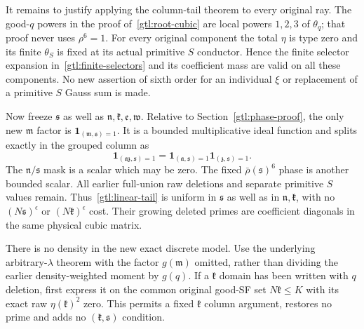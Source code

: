 It remains to justify applying the column-tail theorem
to every original ray. The good-$q$ powers in the proof
of~\eqref{gtl:root-cubic} are local powers $1,2,3$ of
$\theta_q$; that proof never uses $\rho^6=1$.
For every original component the total $\eta$ is type
zero and its finite $\theta_S$ is fixed at its actual
primitive $S$ conductor. Hence the finite selector
expansion in~\eqref{gtl:finite-selectors} and its
coefficient mass are valid on all these components.
No new assertion of sixth order for an individual
$\xi$ or replacement of a primitive $S$ Gauss sum is made.

Now freeze $\mathfrak s$ as well as
$\mathfrak n,\mathfrak k,\mathfrak e,\mathfrak w$.
Relative to Section~\ref{gtl:phase-proof}, the only new
$\mathfrak m$ factor is
$\mathbf1_{(\mathfrak m,\mathfrak s)=1}$.
It is a bounded multiplicative ideal function and
splits exactly in the grouped column as
\begin{equation}\label{gtl:s-mask-split}
 \mathbf1_{(\mathfrak a\mathfrak z,\mathfrak s)=1}
   =\mathbf1_{(\mathfrak a,\mathfrak s)=1}
      \mathbf1_{(\mathfrak z,\mathfrak s)=1}.
\end{equation}
The $\mathfrak n/\mathfrak s$ mask is a scalar which may
be zero. The fixed $\bar\rho(\mathfrak s)^6$ phase is
another bounded scalar. All earlier full-union raw
deletions and separate primitive $S$ values remain.
Thus~\eqref{gtl:linear-tail} is uniform in
$\mathfrak s$ as well as in $\mathfrak n,\mathfrak k$,
with no $(N\mathfrak s)^\epsilon$ or
$(N\mathfrak k)^\epsilon$ cost. Their growing deleted
primes are coefficient diagonals in the same physical
cubic matrix.

There is no density in the new exact discrete model.
Use the underlying arbitrary-$\lambda$ theorem with
the factor $g(\mathfrak m)$ omitted, rather than dividing
the earlier density-weighted moment by $g(q)$.
If a $\mathfrak k$ domain has been written with
$q$ deletion, first express it on the common original
good-SF set $N\mathfrak k\le K$ with its exact raw
$\eta(\mathfrak k)^2$ zero. This permits a fixed
$\mathfrak k$ column argument, restores no prime and
adds no $(\mathfrak k,\mathfrak s)$ condition.

